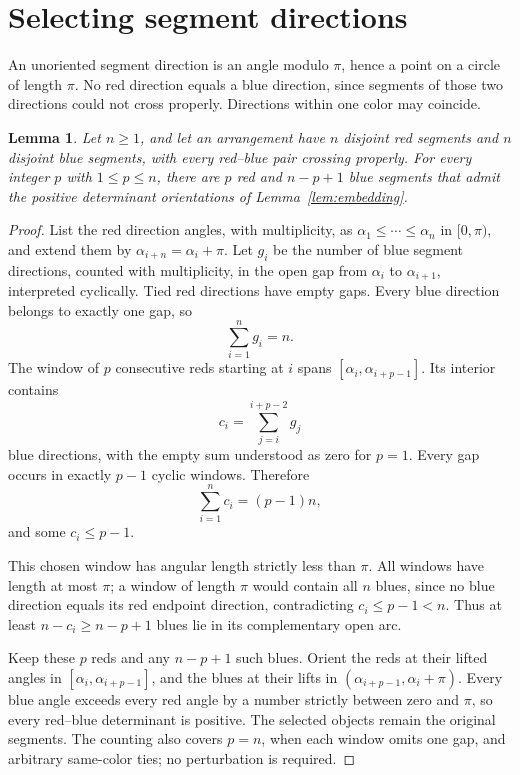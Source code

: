 \documentclass[11pt]{article}
\newtheorem{lemma}[theorem]{Lemma}
\begin{document}
\section{Selecting segment directions}

An unoriented segment direction is an angle modulo \(\pi\), hence a
point on a circle of length \(\pi\). No red direction equals a blue
direction, since segments of those two directions could not cross
properly. Directions within one color may coincide.

\begin{lemma}\label{lem:selection}
Let \(n\geq1\), and let an arrangement have \(n\) disjoint red segments
and \(n\) disjoint blue segments, with every red--blue pair crossing
properly. For every integer \(p\) with \(1\leq p\leq n\), there are
\(p\) red and \(n-p+1\) blue segments that admit the positive
determinant orientations of Lemma~\ref{lem:embedding}.
\end{lemma}
\begin{proof}
List the red direction angles, with multiplicity, as
\(\alpha_1\leq\cdots\leq\alpha_n\) in \([0,\pi)\), and extend them by
\(\alpha_{i+n}=\alpha_i+\pi\).
Let \(g_i\) be the number of blue segment directions, counted with
multiplicity, in the open gap from
\(\alpha_i\) to \(\alpha_{i+1}\), interpreted cyclically.
Tied red directions have empty gaps. Every blue direction belongs
to exactly one gap, so
\[
 \sum_{i=1}^n g_i=n.
\]
The window of \(p\) consecutive reds starting at \(i\) spans
\([\alpha_i,\alpha_{i+p-1}]\). Its interior contains
\[
 c_i=\sum_{j=i}^{i+p-2}g_j
\]
blue directions, with the empty sum understood as zero for \(p=1\).
Every gap occurs in exactly \(p-1\) cyclic windows. Therefore
\[
 \sum_{i=1}^n c_i=(p-1)n,
\]
and some \(c_i\leq p-1\).

This chosen window has angular length strictly less than \(\pi\).
All windows have length at most \(\pi\); a window of length \(\pi\)
would contain all \(n\) blues, since no blue direction equals its
red endpoint direction, contradicting \(c_i\leq p-1<n\).
Thus at least \(n-c_i\geq n-p+1\) blues lie in its complementary
open arc.

Keep these \(p\) reds and any \(n-p+1\) such blues. Orient the reds
at their lifted angles in \([\alpha_i,\alpha_{i+p-1}]\), and the
blues at their lifts in \((\alpha_{i+p-1},\alpha_i+\pi)\).
Every blue angle exceeds every red angle by a number strictly between
zero and \(\pi\), so every red--blue determinant is positive.
The selected objects remain the original segments.
The counting also covers \(p=n\), when each window omits one gap,
and arbitrary same-color ties; no perturbation is required.
\end{proof}
\end{document}
